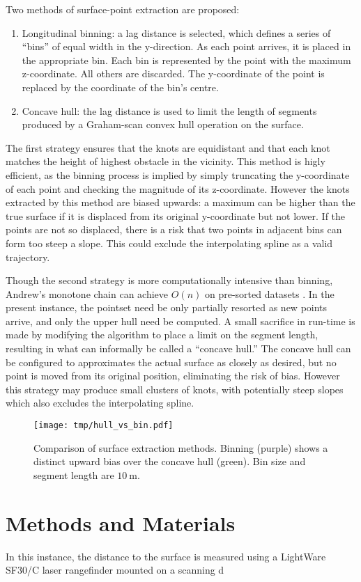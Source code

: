 \documentclass[doc]{apa6}
\begin{document}
Two methods of surface-point extraction are proposed: 

\begin{enumerate}
\item Longitudinal binning: a lag distance is selected, which defines a series of ``bins'' of equal width in the y-direction. As each point arrives, it is placed in the appropriate bin. Each bin is represented by the point with the maximum z-coordinate. All others are discarded. The y-coordinate of the point is replaced by the coordinate of the bin's centre.
\item Concave hull: the lag distance is used to limit the length of segments produced by a Graham-scan convex hull operation on the surface. 
\end{enumerate}

The first strategy ensures that the knots are equidistant and that each knot matches the height of highest obstacle in the vicinity. This method is higly efficient, as the binning process is implied by simply truncating the y-coordinate of each point and checking the magnitude of its z-coordinate. However the knots extracted by this method are biased upwards: a maximum can be higher than the true surface if it is displaced from its original y-coordinate but not lower. If the points are not so displaced, there is a risk that two points in adjacent bins can form too steep a slope. This could exclude the interpolating spline as a valid trajectory.


Though the second strategy is more computationally intensive than binning, Andrew's monotone chain can achieve $O(n)$ on pre-sorted datasets \parencite{Andrew1979}. In the present instance, the pointset need be only partially resorted as new points arrive, and only the upper hull need be computed. A small sacrifice in run-time is made by modifying the algorithm to place a limit on the segment length, resulting in what can informally be called a ``concave hull.'' The concave hull can be configured to approximates the actual surface as closely as desired, but no point is moved from its original position, eliminating the risk of bias. However this strategy may produce small clusters of knots, with potentially steep slopes which also excludes the interpolating spline.


\begin{figure} %
\texttt{[image: tmp/hull\_vs\_bin.pdf]} 
\caption{Comparison of surface extraction methods. Binning (purple) shows a distinct upward bias over the concave hull (green). Bin size and segment length are $\SI{10}\m$.}
\label{fig:hull_vs_bin}
\end{figure}


\section{Methods and Materials}


 In this instance, the distance to the surface is measured using a LightWare SF30/C laser rangefinder mounted on a scanning d


\newpage

\printbibliography
\end{document}

